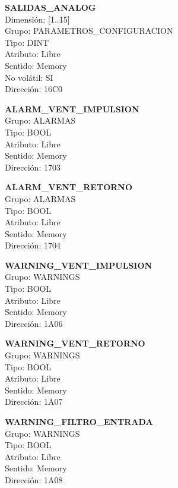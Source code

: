 \vspace{10mm}

\textbf{SALIDAS\_ANALOG}\\Dimensión: [1..15]\\Grupo: PARAMETROS\_CONFIGURACION\\Tipo: DINT\\Atributo: Libre\\Sentido: Memory\\No volátil: SI\\Dirección: 16C0

\vspace{10mm}

\textbf{ALARM\_VENT\_IMPULSION}\\Grupo: ALARMAS\\Tipo: BOOL\\Atributo: Libre\\Sentido: Memory\\Dirección: 1703

\vspace{10mm}

\textbf{ALARM\_VENT\_RETORNO}\\Grupo: ALARMAS\\Tipo: BOOL\\Atributo: Libre\\Sentido: Memory\\Dirección: 1704

\vspace{10mm}

\textbf{WARNING\_VENT\_IMPULSION}\\Grupo: WARNINGS\\Tipo: BOOL\\Atributo: Libre\\Sentido: Memory\\Dirección: 1A06

\vspace{10mm}

\textbf{WARNING\_VENT\_RETORNO}\\Grupo: WARNINGS\\Tipo: BOOL\\Atributo: Libre\\Sentido: Memory\\Dirección: 1A07

\vspace{10mm}

\textbf{WARNING\_FILTRO\_ENTRADA}\\Grupo: WARNINGS\\Tipo: BOOL\\Atributo: Libre\\Sentido: Memory\\Dirección: 1A08

